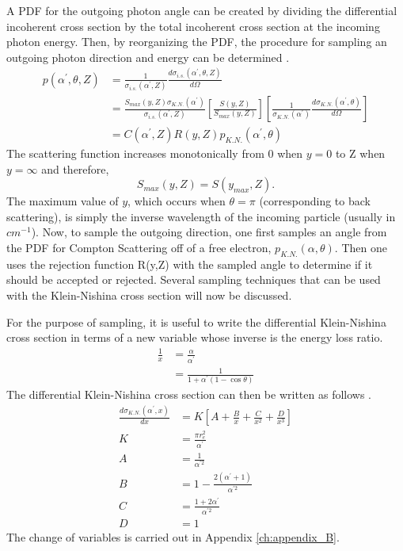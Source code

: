 A PDF for the outgoing photon angle can be created by dividing the differential
incoherent cross section by the total incoherent cross section at the incoming
photon energy. Then, by reorganizing the PDF, the procedure for sampling an
outgoing photon direction and energy can be determined 
\citep{persliden_monte_1983}.
\begin{align}
  p(\alpha^{'},\theta,Z) & = \frac{1}{\sigma_{i.s.}(\alpha^{'},Z)}
  \frac{d\sigma_{i.s.}(\alpha^{'},\theta,Z)}{d\Omega} \nonumber \\
  & = \frac{S_{max}(y,Z) \sigma_{K.N.}(\alpha^{'})}{\sigma_{i.s.}(\alpha^{'},Z)}
  \left[ \frac{S(y,Z)}{S_{max}(y,Z)} \right]
  \left[ \frac{1}{\sigma_{K.N.}(\alpha^{'})} 
    \frac{d\sigma_{K.N.}(\alpha^{'},\theta)}
         {d\Omega} \right] \nonumber \\
  & = C(\alpha^{'},Z) R(y,Z) p_{K.N.}(\alpha^{'},\theta) 
\end{align}
The scattering function increases monotonically from 0 when $y=0$ to Z when
$y=\infty$ and therefore,
\begin{equation*} 
S_{max}(y,Z) = S(y_{max},Z).
\end{equation*}
The maximum value of $y$, which occurs when $\theta = \pi$ (corresponding to
back scattering), is simply the inverse wavelength of the incoming 
particle (usually in $cm^{-1}$). Now, to sample the outgoing direction, one 
first samples an angle from the PDF for Compton Scattering off of a free 
electron, $p_{K.N.}(\alpha,\theta)$. Then one uses the rejection function R(y,Z)
with the sampled angle to determine if it should be accepted or rejected. 
Several sampling techniques that can be used with the Klein-Nishina cross 
section will now be discussed.

For the purpose of sampling, it is useful to write the differential 
Klein-Nishina cross section in terms of a new variable whose inverse is the 
energy loss ratio.
\begin{align}
  \frac{1}{x} & = \frac{\alpha}{\alpha^{'}} \\
  & = \frac{1}{1+\alpha^{'}(1-\cos{\theta})}
\end{align}
The differential Klein-Nishina cross section can then be written as follows 
\citep{lux_monte_1991}.
\begin{align}
  \frac{d\sigma_{K.N.}(\alpha^{'},x)}{dx} & = K \left[ A + \frac{B}{x} +
    \frac{C}{x^2} + \frac{D}{x^3} \right] \\
  K & = \frac{\pi r_e^2}{\alpha^{'}} \nonumber \\
  A & = \frac{1}{\alpha^{'2}} \nonumber \\
  B & = 1 - \frac{2(\alpha^{'} + 1)}{\alpha^{'2}} \nonumber \\
  C & = \frac{1 + 2\alpha^{'}}{\alpha^{'2}} \nonumber \\
  D & = 1 \nonumber
\end{align}
The change of variables is carried out in Appendix \ref{ch:appendix_B}.

